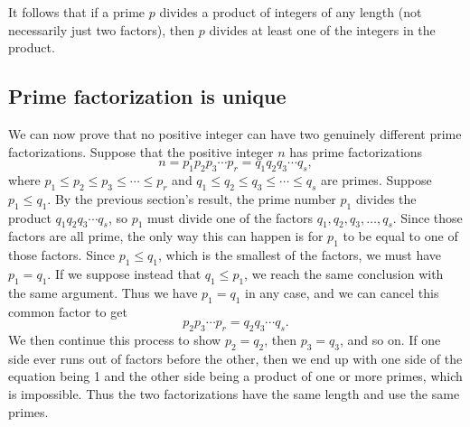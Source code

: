 It follows that if a prime $p$ divides a product of integers of any length (not necessarily just two factors), then $p$ divides at least one of the integers in the product.


\subsection{Prime factorization is unique}

We can now prove that no positive integer can have two genuinely different prime factorizations. Suppose that the positive integer $n$ has prime factorizations
\begin{equation*}
n = p_1p_2p_3\cdots p_r = q_1q_2q_3\cdots q_s,
\end{equation*}
where $p_1\leq p_2\leq p_3\leq\cdots\leq p_r$ and $q_1\leq q_2\leq q_3\leq\cdots\leq q_s$ are primes. Suppose $p_1\leq q_1$. By the previous section's result, the prime number $p_1$ divides the product $q_1q_2q_3\cdots q_s$, so $p_1$ must divide one of the factors $q_1, q_2, q_3, \ldots, q_s$. Since those factors are all prime, the only way this can happen is for $p_1$ to be equal to one of those factors. Since $p_1\leq q_1$, which is the smallest of the factors, we must have $p_1 = q_1$. If we suppose instead that $q_1\leq p_1$, we reach the same conclusion with the same argument. Thus we have $p_1 = q_1$ in any case, and we can cancel this common factor to get
\begin{equation*}
p_2p_3\cdots p_r = q_2q_3\cdots q_s.
\end{equation*}
We then continue this process to show $p_2 = q_2$, then $p_3 = q_3$, and so on. If one side ever runs out of factors before the other, then we end up with one side of the equation being 1 and the other side being a product of one or more primes, which is impossible. Thus the two factorizations have the same length and use the same primes.
